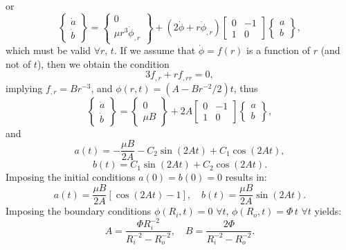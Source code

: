 or
\begin{equation}
  \left\{ \begin{array}{c} \dot{a} \\ \dot{b} \end{array} \right\} = \left\{ \begin{array}{c} 0 \\ \mu r^3 \dot{\phi}_{,r} \end{array} \right\} + (2 \dot{\phi} + r \dot{\phi}_{,r}) \left[ \begin{array}{cc} 0 & -1 \\ 1 & 0 \end{array} \right] \left\{ \begin{array}{c} a \\ b \end{array} \right\},
\end{equation}
which must be valid $\forall r, \, t$. If we assume that $\dot{\phi} = f(r)$ is a function of $r$ (and not of $t$), then we obtain the condition
\begin{equation}
  3 f_{,r} + r f_{,rr} = 0,
\end{equation}
implying $f_{,r} = B r^{-3}$, and $\phi (r, t) = (A - B r^{-2} / 2)t$, thus
\begin{equation}
  \left\{ \begin{array}{c} \dot{a} \\ \dot{b} \end{array} \right\} = \left\{ \begin{array}{c} 0 \\ \mu B \end{array} \right\} + 2 A \left[ \begin{array}{cc} 0 & -1 \\ 1 & 0 \end{array} \right] \left\{ \begin{array}{c} a \\ b \end{array} \right\},
\end{equation}
and
\begin{equation}
  a(t) = - \frac{\mu B}{2 A} - C_2 \sin (2 A t) + C_1 \cos (2 A t),
\end{equation}
\begin{equation}
  b(t) = C_1 \sin (2 A t) + C_2 \cos (2 A t).
\end{equation}
Imposing the initial conditions $a(0) = b(0) = 0$ results in:
\begin{equation}
  a(t) = \frac{\mu B}{2 A} \left[ \cos (2 A t) - 1 \right], \quad b(t) = \frac{\mu B}{2 A} \sin (2 A t).
\end{equation}
Imposing the boundary conditions $\phi(R_i,t) = 0 \, \, \forall t$, $\phi(R_o,t) = \Phi \, t \, \, \forall t$ yields:
\begin{equation}
  A = \frac{\Phi R_i^{-2}}{R_i^{-2} - R_o^{-2}}, \quad B = \frac{2 \Phi}{R_i^{-2} - R_o^{-2}}.
\end{equation}

